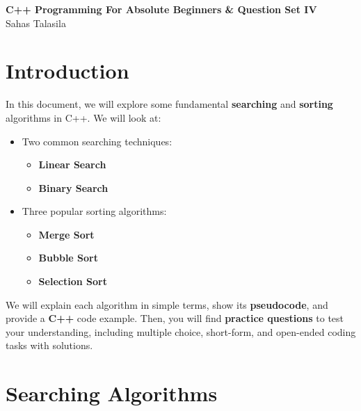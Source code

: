 \documentclass[a4paper,12pt]{article}
\begin{document}
\pagestyle{empty} 

\begin{titlepage}
    \centering
    \vspace*{2cm}
    \Huge{\textbf{C++ Programming For Absolute Beginners \& Question Set IV}} \\[1.5cm]
    \Large{Sahas Talasila} \\[1cm]
    \vfill
    \vfill
\end{titlepage}

\tableofcontents
\newpage

\section{Introduction}
In this document, we will explore some fundamental \textbf{searching} and \textbf{sorting} algorithms in C++. We will look at:

\begin{itemize}
    \item Two common searching techniques:
    \begin{itemize}
        \item \textbf{Linear Search}
        \item \textbf{Binary Search}
    \end{itemize}
    \item Three popular sorting algorithms:
    \begin{itemize}
        \item \textbf{Merge Sort}
        \item \textbf{Bubble Sort}
        \item \textbf{Selection Sort}
    \end{itemize}
\end{itemize}

We will explain each algorithm in simple terms, show its \textbf{pseudocode}, and provide a \textbf{C++} code example. Then, you will find \textbf{practice questions} to test your understanding, including multiple choice, short-form, and open-ended coding tasks with solutions.

\newpage
\section{Searching Algorithms}
\end{document}

